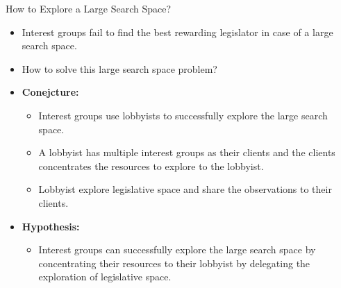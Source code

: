 \documentclass{beamer}
\begin{document}
	\begin{frame}{How to Explore a Large Search Space?}
		\begin{itemize}
			\item Interest groups fail to find the best rewarding legislator in case of a large search space.
			\item How to solve this large search space problem?
			\item \textbf{Conejcture: }
				\begin{itemize}
				\item Interest groups use lobbyists to successfully explore the large search space. 
				\item A lobbyist has multiple interest groups as their clients and the clients concentrates the resources to explore to the lobbyist. 
				\item Lobbyist explore legislative space and share the observations to their clients.
			\end{itemize}
			\item \textbf{Hypothesis: }
			\begin{itemize}
			\item Interest groups can successfully explore the large search space by concentrating their resources to their lobbyist by delegating the exploration of legislative space.
			\end{itemize}
	\end{itemize}
	\end{frame}
\end{document}
